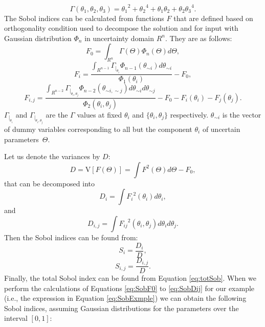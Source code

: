\begin{equation}
\Gamma(\theta_1,\theta_2,\theta_3) =
{\theta_1}^2+{\theta_2}^4+{\theta_1}{\theta_2}+{\theta_2}{\theta_3}^4.
\label{eq:SobExmple}\end{equation} The Sobol indices can be calculated from
functions $F$ that are defined based on orthogonality condition used to
decompose the solution and for input with Gaussian distribution $\Phi_n$ in
uncertainty domain $R^n$. They are as follows:
\begin{equation}
F_0=\int_{R^n}\Gamma(\Theta) \Phi_n(\Theta) d\Theta,
\label{eq:SobF0}\end{equation}
\begin{equation}
F_i=\frac{\int_{R^{n-1}}\Gamma_{|_{\theta_i}}
\Phi_{n-1}(\theta_{\sim i}) d\theta_{\sim i}}{\Phi_{1}(\theta_i)} - F_0,
\label{eq:SobFi}\end{equation}
\begin{equation}
F_{i,j}=\frac{\int_{R^{n-2}}\Gamma_{|_{\theta_i,\theta_j}}
\Phi_{n-2}(\theta_{\sim i,\sim j}) d\theta_{\sim i} d\theta_{\sim
j}}{\Phi_{2}(\theta_i,\theta_j)}-F_0-F_i(\theta_i)-F_j(\theta_j).
\label{eq:SobFij}\end{equation} $\Gamma_{|_{\theta_i}}$ and
$\Gamma_{|_{\theta_i,\theta_j}}$ are the $\Gamma$ values at fixed $\theta_i$ and
$\{\theta_i,\theta_j\}$ respectively. $\theta_{\sim i}$ is the vector of dummy
variables corresponding to all but the component $\theta_i$ of uncertain
parameters~$\Theta$.

Let us denote the variances by $D$:
\begin{equation}
D=\mbox{V}[F(\Theta)]=\int F^2(\Theta) d\Theta-F_0,
\label{eq:SobD}\end{equation} that can be decomposed into 
\begin{equation}
D_i=\int{F_i}^2(\theta_i) d\theta_i,
\label{eq:SobDi}\end{equation} and
\begin{equation} 
D_{i,j}=\int{F_{ij}}^2(\theta_{i},\theta_{j}) d\theta_{i}d\theta_{j}.
\label{eq:SobDij}\end{equation} Then the Sobol indices can be found from:
\begin{equation} 
S_i=\frac{D_i}{D},
\label{eq:SiDi}\end{equation}
\begin{equation} 
S_{i,j}=\frac{D_{i,j}}{D}.
\label{eq:SijDij}\end{equation} Finally, the total Sobol index can be found
from Equation \ref{eq:totSob}. When we perform the calculations of Equations
\ref{eq:SobF0} to \ref{eq:SobDij} for our example (i.e., the expression in
Equation \ref{eq:SobExmple}) we can obtain the following Sobol
indices,
assuming Gaussian distributions for the parameters over the interval $[0,1]$:

